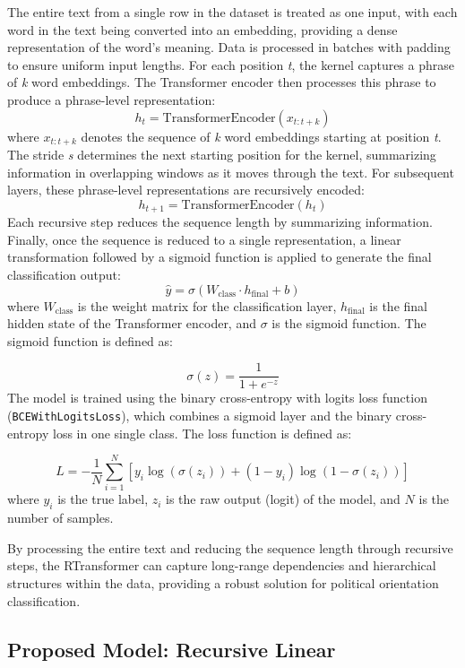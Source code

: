 \documentclass[10pt, a4paper]{article}
\begin{document}
The entire text from a single row in the dataset is treated as one input, with each word in the text being converted into an embedding, providing a dense representation of the word's meaning. Data is processed in batches with padding to ensure uniform input lengths. For each position \textit{t}, the kernel captures a phrase of \textit{k} word embeddings. The Transformer encoder then processes this phrase to produce a phrase-level representation:
\[
h_{t} = \text{TransformerEncoder}(x_{t:t+k})
\]
where \(\mathit{x}_{t:t+k}\) denotes the sequence of \textit{k} word embeddings starting at position \textit{t}. The stride \textit{s} determines the next starting position for the kernel, summarizing information in overlapping windows as it moves through the text. For subsequent layers, these phrase-level representations are recursively encoded:
\[
h_{t+1} = \text{TransformerEncoder}(h_{t})
\]
Each recursive step reduces the sequence length by summarizing information. Finally, once the sequence is reduced to a single representation, a linear transformation followed by a sigmoid function is applied to generate the final classification output:
\[
\hat{y} = \sigma(W_{\text{class}} \cdot h_{\text{final}} + b)
\]
where \( W_{\text{class}} \) is the weight matrix for the classification layer, \( h_{\text{final}} \) is the final hidden state of the Transformer encoder, and \( \sigma \) is the sigmoid function. The sigmoid function is defined as:

\[
\sigma(z) = \frac{1}{1 + e^{-z}}
\]
The model is trained using the binary cross-entropy with logits loss function (\texttt{BCEWithLogitsLoss}), which combines a sigmoid layer and the binary cross-entropy loss in one single class. The loss function is defined as:

\[
L = -\frac{1}{N} \sum_{i=1}^{N} \left[ y_{i} \log(\sigma(z_{i})) + (1 - y_{i}) \log(1 - \sigma(z_{i})) \right]
\]
where \( y_{i} \) is the true label, \( z_{i} \) is the raw output (logit) of the model, and \( N \) is the number of samples.


By processing the entire text and reducing the sequence length through recursive steps, the RTransformer can capture long-range dependencies and hierarchical structures within the data, providing a robust solution for political orientation classification.

\subsection{Proposed Model: Recursive Linear} 
\end{document}
